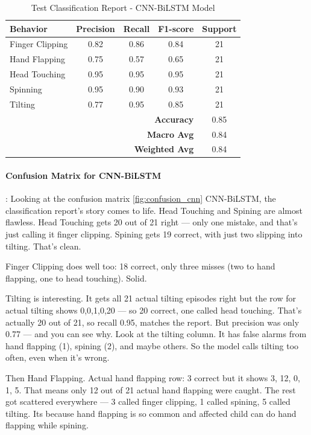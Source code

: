 \begin{table}[htbp]
\centering
\caption{Test Classification Report - CNN-BiLSTM Model}
\label{tab:test_classification_report}
\begin{tabular}{l c c c c}
\hline
\textbf{Behavior} & \textbf{Precision} & \textbf{Recall} & \textbf{F1-score} & \textbf{Support} \\
\hline
Finger Clipping & 0.82 & 0.86 & 0.84 & 21 \\
Hand Flapping & 0.75 & 0.57 & 0.65 & 21 \\
Head Touching & 0.95 & 0.95 & 0.95 & 21 \\
Spinning & 0.95 & 0.90 & 0.93 & 21 \\
Tilting & 0.77 & 0.95 & 0.85 & 21 \\
\hline
\multicolumn{4}{r}{\textbf{Accuracy}} & 0.85 \\
\multicolumn{4}{r}{\textbf{Macro Avg}} & 0.84 \\
\multicolumn{4}{r}{\textbf{Weighted Avg}} & 0.84 \\
\hline
\end{tabular}
\end{table}

\paragraph{Confusion Matrix for CNN-BiLSTM} :
Looking at the confusion matrix \ref{fig:confusion_cnn} CNN-BiLSTM, the classification report's story comes to life. Head Touching and Spining are almost flawless. Head Touching gets 20 out of 21 right — only one mistake, and that's just calling it finger clipping. Spining gets 19 correct, with just two slipping into tilting. That's clean.

Finger Clipping does well too: 18 correct, only three misses (two to hand flapping, one to head touching). Solid.

Tilting is interesting. It gets all 21 actual tilting episodes right but the row for actual tilting shows 0,0,1,0,20 — so 20 correct, one called head touching. That's actually 20 out of 21, so recall 0.95, matches the report. But precision was only 0.77 — and you can see why. Look at the tilting column. It has false alarms from hand flapping (1), spining (2), and maybe others. So the model calls tilting too often, even when it's wrong.

Then Hand Flapping. Actual hand flapping row: 3 correct but it shows 3, 12, 0, 1, 5. That means only 12 out of 21 actual hand flapping were caught. The rest got scattered everywhere — 3 called finger clipping, 1 called spining, 5 called tilting. Its because hand flapping is so common and affected child can do hand flapping while spining.

